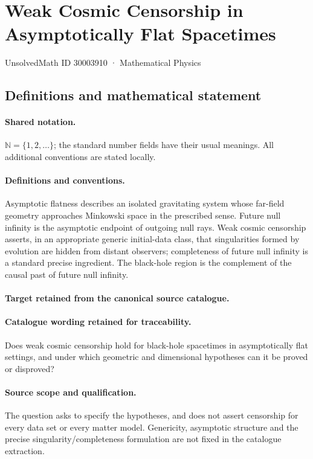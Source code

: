 \documentclass[11pt]{article}
\begin{document}
\setcounter{section}{30003909}
\section{Weak Cosmic Censorship in Asymptotically Flat Spacetimes}\label{30003910}
{\small UnsolvedMath ID 30003910 · Mathematical Physics}
\subsection{Definitions and mathematical statement}

\paragraph{Shared notation.}$\mathbb N=\{1,2,\ldots\}$; the standard number fields have their usual meanings. All additional conventions are stated locally.


\paragraph{Definitions and conventions.}
Asymptotic flatness describes an isolated gravitating system whose far-field geometry approaches Minkowski space in the prescribed sense. Future null infinity is the asymptotic endpoint of outgoing null rays. Weak cosmic censorship asserts, in an appropriate generic initial-data class, that singularities formed by evolution are hidden from distant observers; completeness of future null infinity is a standard precise ingredient. The black-hole region is the complement of the causal past of future null infinity.

\paragraph{Target retained from the canonical source catalogue.}
\paragraph{Catalogue wording retained for traceability.}
Does weak cosmic censorship hold for black-hole spacetimes in asymptotically flat settings, and under which geometric and dimensional hypotheses can it be proved or disproved?

\paragraph{Source scope and qualification.}
The question asks to specify the hypotheses, and does not assert censorship for every data set or every matter model. Genericity, asymptotic structure and the precise singularity/completeness formulation are not fixed in the catalogue extraction.
\end{document}
